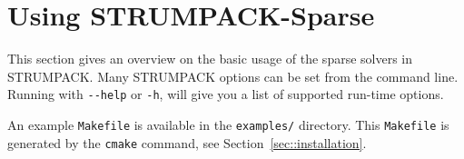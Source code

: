 \documentclass{article}
\begin{document}
\section{Using STRUMPACK-Sparse}\label{sec:usage}
This section gives an overview on the basic usage of the sparse
solvers in STRUMPACK.
Many STRUMPACK options can be set from the command line. Running with
\lstinline[style=Bash]!--help! or \lstinline[style=Bash]!-h!, will
give you a list of supported run-time options.

An example \lstinline[style=Bash]!Makefile! is available in the
\lstinline[style=Bash]!examples/! directory. This
\lstinline[style=Bash]!Makefile! is generated by the
\lstinline[style=Bash]!cmake! command, see
Section~\ref{sec::installation}.
\end{document}
